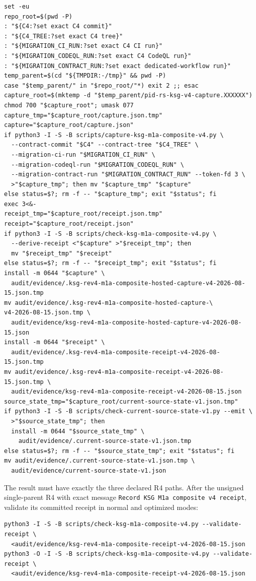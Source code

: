 \documentclass[11pt,a4paper]{article}
\begin{document}
\begin{verbatim}
set -eu
repo_root=$(pwd -P)
: "${C4:?set exact C4 commit}"
: "${C4_TREE:?set exact C4 tree}"
: "${MIGRATION_CI_RUN:?set exact C4 CI run}"
: "${MIGRATION_CODEQL_RUN:?set exact C4 CodeQL run}"
: "${MIGRATION_CONTRACT_RUN:?set exact dedicated-workflow run}"
temp_parent=$(cd "${TMPDIR:-/tmp}" && pwd -P)
case "$temp_parent/" in "$repo_root/"*) exit 2 ;; esac
capture_root=$(mktemp -d "$temp_parent/pid-rs-ksg-v4-capture.XXXXXX")
chmod 700 "$capture_root"; umask 077
capture_tmp="$capture_root/capture.json.tmp"
capture="$capture_root/capture.json"
if python3 -I -S -B scripts/capture-ksg-m1a-composite-v4.py \
  --contract-commit "$C4" --contract-tree "$C4_TREE" \
  --migration-ci-run "$MIGRATION_CI_RUN" \
  --migration-codeql-run "$MIGRATION_CODEQL_RUN" \
  --migration-contract-run "$MIGRATION_CONTRACT_RUN" --token-fd 3 \
  >"$capture_tmp"; then mv "$capture_tmp" "$capture"
else status=$?; rm -f -- "$capture_tmp"; exit "$status"; fi
exec 3<&-
receipt_tmp="$capture_root/receipt.json.tmp"
receipt="$capture_root/receipt.json"
if python3 -I -S -B scripts/check-ksg-m1a-composite-v4.py \
  --derive-receipt <"$capture" >"$receipt_tmp"; then
  mv "$receipt_tmp" "$receipt"
else status=$?; rm -f -- "$receipt_tmp"; exit "$status"; fi
install -m 0644 "$capture" \
  audit/evidence/.ksg-rev4-m1a-composite-hosted-capture-v4-2026-08-15.json.tmp
mv audit/evidence/.ksg-rev4-m1a-composite-hosted-capture-\
v4-2026-08-15.json.tmp \
  audit/evidence/ksg-rev4-m1a-composite-hosted-capture-v4-2026-08-15.json
install -m 0644 "$receipt" \
  audit/evidence/.ksg-rev4-m1a-composite-receipt-v4-2026-08-15.json.tmp
mv audit/evidence/.ksg-rev4-m1a-composite-receipt-v4-2026-08-15.json.tmp \
  audit/evidence/ksg-rev4-m1a-composite-receipt-v4-2026-08-15.json
source_state_tmp="$capture_root/current-source-state-v1.json.tmp"
if python3 -I -S -B scripts/check-current-source-state-v1.py --emit \
  >"$source_state_tmp"; then
  install -m 0644 "$source_state_tmp" \
    audit/evidence/.current-source-state-v1.json.tmp
else status=$?; rm -f -- "$source_state_tmp"; exit "$status"; fi
mv audit/evidence/.current-source-state-v1.json.tmp \
  audit/evidence/current-source-state-v1.json
\end{verbatim}

The result must have exactly the three declared R4 paths. After the unsigned single-parent R4 with
exact message \texttt{Record KSG M1a composite v4 receipt}, validate its committed receipt in normal
and optimized modes:

\begin{verbatim}
python3 -I -S -B scripts/check-ksg-m1a-composite-v4.py --validate-receipt \
  <audit/evidence/ksg-rev4-m1a-composite-receipt-v4-2026-08-15.json
python3 -O -I -S -B scripts/check-ksg-m1a-composite-v4.py --validate-receipt \
  <audit/evidence/ksg-rev4-m1a-composite-receipt-v4-2026-08-15.json
\end{verbatim}
\end{document}
